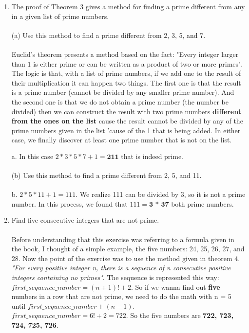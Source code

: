 \documentclass{article}
\begin{document}
\begin{enumerate}
    \item 
        The proof of Theorem 3 gives a method for finding a prime different
        from any in a given list of prime numbers.\\\\
        (a) Use this method to find a prime different from 2, 3, 5, and 7.\\\\
        Euclid's theorem presents a method based on the fact: "Every integer larger than 1 is either prime or can be written as a product of two or more primes". The logic is that, with a list of prime numbers, if we add one to the result of their multiplication it can happen two things. The first one is that the result is a prime number (cannot be divided by any smaller prime number).
        And the second one is that we do not obtain a prime number (the number be divided) then we can construct the result with two prime numbers \textbf{different from the ones on the list} cause the result cannot be divided by any of the prime numbers given in the list 'cause of the 1 that is being added. In either case, we finally discover at least one prime number that is not on the list.
        
        a. In this case $2 * 3 * 5 * 7 + 1 = \textbf{211}$ that is indeed prime.
        \\\\
        (b) Use this method to find a prime different from 2, 5, and 11.
        \\\\
        b. $2 * 5 * 11 + 1= 111$. We realize 111 can be divided by 3, so it is not a prime number. In this process, we found that $111 = \textbf{3 * 37}$ both prime numbers.
    
    \item
        Find five consecutive integers that are not prime.\\\\
        Before understanding that this exercise was referring to a formula given in the book,
        I thought of a simple example, the five numbers: 24, 25, 26, 27, and 28. Now
        the point of the exercise was to use the method given in theorem 4.
        \textit{"For every positive integer n, there is a sequence of n consecutive positive integers
        containing no primes"}. The sequence is represented this way: $first\_sequence\_number = (n + 1)! + 2$. So if we wanna find out \textbf{five} numbers in a row that are not prime, we need to do the math with n = 5 until $first\_sequence\_number + (n - 1)$.\\
        $first\_sequence\_number = 6! + 2 = 722$. So the five numbers are \textbf{722, 723, 724, 725, 726}.
    

\end{enumerate}
\end{document}
